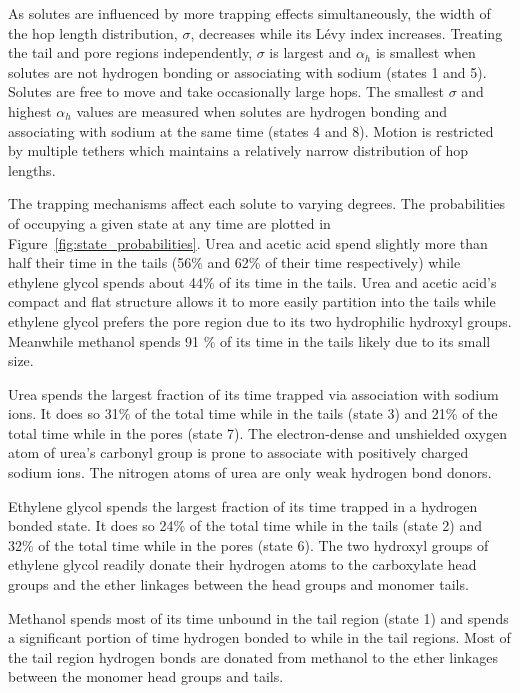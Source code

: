 \documentclass{article}
\begin{document}
  As solutes are influenced by more trapping effects simultaneously, the width of
  the hop length distribution, $\sigma$, decreases while its L\'evy index increases.
  Treating the tail and pore regions independently, $\sigma$ is largest and $\alpha_h$
  is smallest when solutes are not hydrogen bonding or associating with sodium (states 1 and 5).
  Solutes are free to move and take occasionally large hops. The smallest $\sigma$
  and highest $\alpha_h$ values are measured when solutes are hydrogen bonding and 
  associating with sodium at the same time (states 4 and 8). Motion is restricted 
  by multiple tethers which maintains a relatively narrow distribution of hop lengths.
  
  The trapping mechanisms affect each solute to varying degrees. The probabilities
  of occupying a given state at any time are plotted in Figure~\ref{fig:state_probabilities}.
  Urea and acetic acid spend slightly more than half their time in the tails (56\% and 62\% 
  of their time respectively) while ethylene glycol spends about 44\% of its time in the tails.
  Urea and acetic acid's compact and flat structure allows it to more easily 
  partition into the tails while ethylene glycol prefers the pore region due to 
  its two hydrophilic hydroxyl groups. Meanwhile methanol spends 91 \% of its 
  time in the tails likely due to its small size.
  
  Urea spends the largest fraction of its time trapped via association with sodium ions.
  It does so 31\% of the total time while in the tails (state 3) and 21\% of the
  total time while in the pores (state 7). The electron-dense and unshielded oxygen
  atom of urea's carbonyl group is prone to associate with positively charged sodium
  ions. The nitrogen atoms of urea are only weak hydrogen bond donors.
  
  Ethylene glycol spends the largest fraction of its time trapped in a hydrogen
  bonded state. It does so 24\% of the total time while in the tails (state 2)
  and 32\% of the total time while in the pores (state 6). The two hydroxyl groups 
  of ethylene glycol readily donate their hydrogen atoms to the carboxylate
  head groups and the ether linkages between the head groups and monomer tails. 
  
  Methanol spends most of its time unbound in the tail region (state 1) and spends a 
  significant portion of time hydrogen bonded to while in the tail regions.
  Most of the tail region hydrogen bonds are donated from methanol to the ether
  linkages between the monomer head groups and tails.
  
\end{document}
